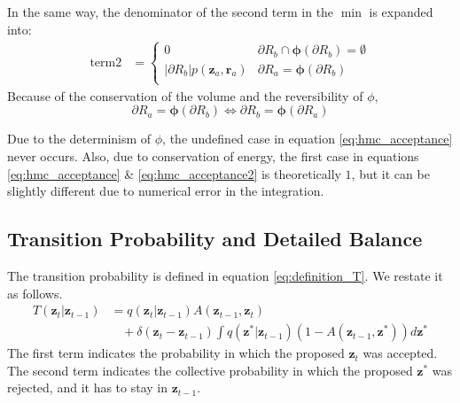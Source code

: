 \documentclass[a4]{article}
\begin{document}
In the same way, the denominator of the second term in the $\min$ is expanded into:
\begin{equation}
\begin{aligned}
\text{term2} &=
    \begin{cases}
        0 & {\partial}R_b \cap \bm{\phi}({\partial}R_b) = \emptyset\\
        \left|{\partial}R_b\right|p( \bm{z}_a, \bm{r}_a )
        & {\partial}R_a = \bm{\phi}({\partial}R_b)\\
    \end{cases}
\end{aligned}
\end{equation}
Because of the conservation of the volume and the reversibility of $\phi$, 
$$ {\partial}R_a = \bm{\phi}({\partial}R_b) \Leftrightarrow
 {\partial}R_b = \bm{\phi}({\partial}R_a)$$

Due to the determinism of $\phi$, the undefined case in equation 
\ref{eq:hmc_acceptance} never occurs.
Also, due to conservation of energy, the first case in equations
\ref{eq:hmc_acceptance} \& \ref{eq:hmc_acceptance2} is theoretically $1$,
but it can be slightly different due to numerical error in the integration.


\subsection{Transition Probability and Detailed Balance}
The transition probability is defined in equation \ref{eq:definition_T}.
We restate it as follows.
\begin{equation}
\begin{aligned}
T\left(\bm{z}_{t}|\bm{z}_{t-1}\right)
&= q\left(\bm{z}_{t}|\bm{z}_{t-1}\right)A\left(\bm{z}_{t-1}, \bm{z}_{t}\right)\\
&\:\:\:\:+ \delta\left(\bm{z}_{t} - \bm{z}_{t-1}\right)
\int q\left(\bm{z}^*|\bm{z}_{t-1}\right)\left(1 - A\left(\bm{z}_{t-1}, \bm{z}^*\right)\right)d\bm{z}^*
\end{aligned}
\end{equation}
The first term indicates the probability in which the proposed $\bm{z}_t$
was accepted. The second term indicates 
the collective probability in which the proposed $\bm{z}^*$ was rejected,
and it has to stay in $\bm{z}_{t-1}$.
\end{document}
